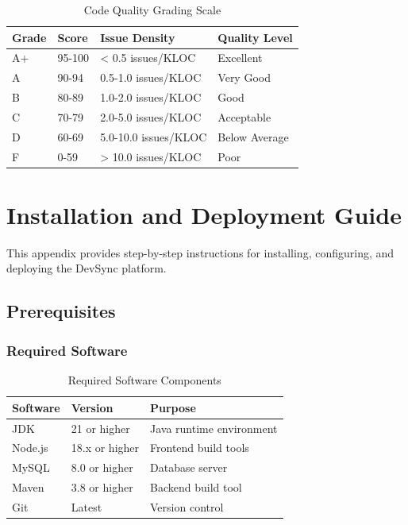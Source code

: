 \documentclass[12pt,a4paper]{article}
\begin{document}
    \begin{table}[H]
        \caption{Code Quality Grading Scale}
        \begin{tabular}{|l|l|l|l|}
            \hline
            \textbf{Grade} & \textbf{Score} & \textbf{Issue Density} & \textbf{Quality Level} \\
            \hline
            A+ & 95-100 & < 0.5 issues/KLOC & Excellent \\
            \hline
            A & 90-94 & 0.5-1.0 issues/KLOC & Very Good \\
            \hline
            B & 80-89 & 1.0-2.0 issues/KLOC & Good \\
            \hline
            C & 70-79 & 2.0-5.0 issues/KLOC & Acceptable \\
            \hline
            D & 60-69 & 5.0-10.0 issues/KLOC & Below Average \\
            \hline
            F & 0-59 & > 10.0 issues/KLOC & Poor \\
            \hline
        \end{tabular}
    \end{table}



    \section{Installation and Deployment Guide}

    This appendix provides step-by-step instructions for installing, configuring, and deploying the DevSync platform.

    \subsection{Prerequisites}

    \subsubsection{Required Software}

    \begin{table}[H]
        \caption{Required Software Components}
        \begin{tabular}{|l|l|p{5cm}|}
            \hline
            \textbf{Software} & \textbf{Version} & \textbf{Purpose} \\
            \hline
            JDK & 21 or higher & Java runtime environment \\
            \hline
            Node.js & 18.x or higher & Frontend build tools \\
            \hline
            MySQL & 8.0 or higher & Database server \\
            \hline
            Maven & 3.8 or higher & Backend build tool \\
            \hline
            Git & Latest & Version control \\
            \hline
        \end{tabular}
    \end{table}
\end{document}
